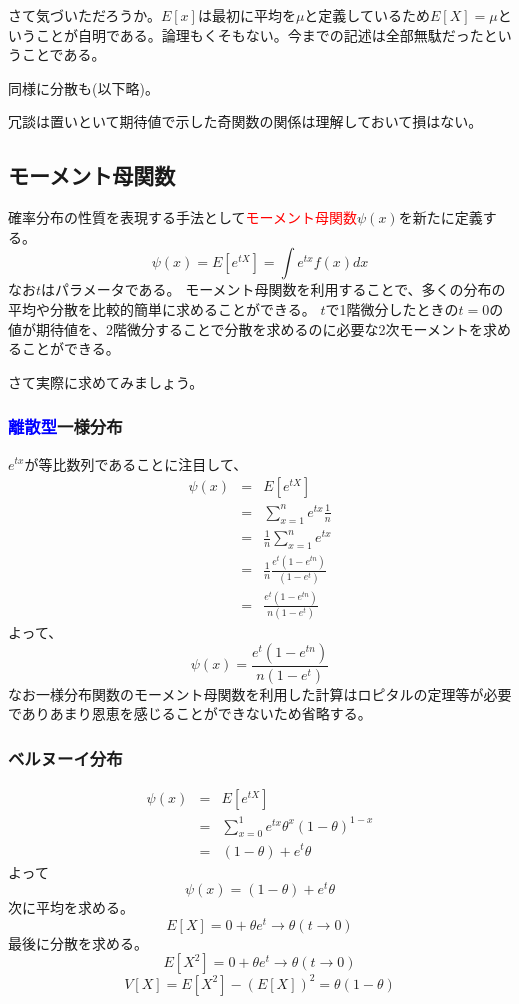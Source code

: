 \documentclass[a4paper,10pt]{jarticle}
\begin{document}
さて気づいただろうか。$E[x]$は最初に平均を$\mu$と定義しているため$E[X]=\mu$ということが自明である。論理もくそもない。今までの記述は全部無駄だったということである。

同様に分散も(以下略)。

冗談は置いといて期待値で示した奇関数の関係は理解しておいて損はない。
\subsection{モーメント母関数}
確率分布の性質を表現する手法として\textcolor{red}{モーメント母関数}$\psi(x)$を新たに定義する。
\begin{equation}
    \psi(x) = E[e^{tX}] = \int e^{tx}f(x)dx\tag{3,21}
\end{equation}
なお$t$はパラメータである。
モーメント母関数を利用することで、多くの分布の平均や分散を比較的簡単に求めることができる。
$t$で1階微分したときの$t=0$の値が期待値を、2階微分することで分散を求めるのに必要な2次モーメントを求めることができる。

さて実際に求めてみましょう。
\subsubsection{\textcolor{blue}{離散型}一様分布}
$e^{tx}$が等比数列であることに注目して、
\begin{eqnarray*}
    \psi(x) &=& E[e^{tX}] \\
    &=& \sum_{x=1}^n e^{tx}\frac{1}{n}\\
    &=& \frac{1}{n}\sum_{x=1}^n e^{tx}\\
    &=& \frac{1}{n}\frac{e^t(1-e^{tn})}{(1-e^t)}\\
    &=& \frac{e^t(1-e^{tn})}{n(1-e^t)}
\end{eqnarray*}
よって、
\begin{equation}
    \psi(x) = \frac{e^t(1-e^{tn})}{n(1-e^t)}\tag{3,22}
\end{equation}
なお一様分布関数のモーメント母関数を利用した計算はロピタルの定理等が必要でありあまり恩恵を感じることができないため省略する。
\subsubsection{ベルヌーイ分布}
\begin{eqnarray*}
    \psi(x) &=& E[e^{tX}] \\
    &=& \sum_{x=0}^1 e^{tx}\theta^x (1-\theta)^{1-x}\\
    &=&(1-\theta)+e^t\theta
\end{eqnarray*}
よって
\begin{equation}
    \psi(x) = (1-\theta)+e^t\theta\tag{3,23}
\end{equation}
次に平均を求める。
\begin{equation}
    E[X] = 0+\theta e^t\rightarrow \theta(t\rightarrow 0)\tag{3,24}
\end{equation}
最後に分散を求める。
\begin{equation}
    E[X^2] = 0+\theta e^t\rightarrow \theta(t\rightarrow 0)\tag{3,25}
\end{equation}
\begin{equation}
    V[X] = E[X^2]-(E[X])^2 = \theta (1-\theta)\tag{3,26}
\end{equation}
\end{document}
